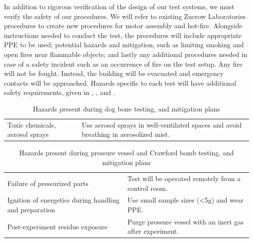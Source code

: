 In addition to rigorous verification of the design of our test systems, we must verify the safety of our procedures. We will refer to existing Zucrow Laboratories procedures to create new procedures for motor assembly and hot-fire. Alongside instructions needed to conduct the test, the procedures will include appropriate PPE to be used; potential hazards and mitigation, such as limiting smoking and open fires near flammable objects; and lastly any additional procedures needed in case of a safety incident such as an occurrence of fire on the test setup. Any fire will not be fought. Instead, the building will be evacuated and emergency contacts will be approached. Hazards specific to each test will have additional safety requirements, given in , , and .

\begin{table}[p]
    \centering

    \begin{longtable}{|>{\raggedright\arraybackslash}p{5.75cm}|>{\raggedright\arraybackslash}p{8.75cm}|}
        \hline
        \multicolumn{1}{|c|}{\textbf{Hazard}} & \multicolumn{1}{c|}{\textbf{Mitigation}} \\ \hline
        Toxic chemicals, aerosol sprays & Use aerosol sprays in well-ventilated spaces and avoid breathing in aerosolized mist. \\ \hline
    \end{longtable}

    \vspace{0.2cm}
    
    \caption{Hazards present during dog bone testing, and mitigation plans}
    \label{table:dogbone-hazards}
\end{table}

\begin{table}[p]
    \centering

    \begin{longtable}{|>{\raggedright\arraybackslash}p{5.75cm}|>{\raggedright\arraybackslash}p{8.75cm}|}
        \hline
        \multicolumn{1}{|c|}{\textbf{Hazard}} & \multicolumn{1}{c|}{\textbf{Mitigation}} \\ \hline
        Failure of pressurized parts & Test will be operated remotely from a control room. \\ \hline
        Ignition of energetics during handling and preparation & Use small sample sizes (<5g) and wear PPE. \\ \hline
        Post-experiment residue exposure & Purge pressure vessel with an inert gas after experiment. \\ \hline
    \end{longtable}

    \vspace{0.2cm}
    
    \caption{Hazards present during pressure vessel and Crawford bomb testing, and mitigation plans}
    \label{table:bomb-hazards}
\end{table}

